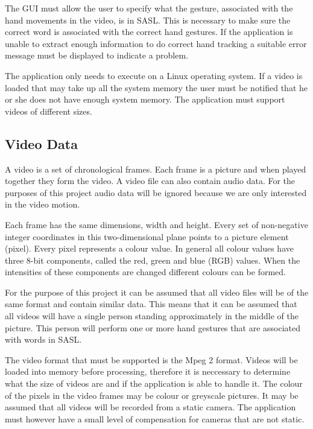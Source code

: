 \documentclass[a4paper,11pt,titlepage]{article}
\begin{document}
The GUI must allow the user to specify what the gesture, associated with the hand movements in the video, is in SASL. This is necessary to make sure the correct word is associated with the correct hand gestures. If the application is unable to extract enough information to do correct hand tracking a suitable error message must be displayed to indicate a problem.

The application only needs to execute on a Linux operating system. If a video is loaded that may take up all the system memory the user must be notified that he or she does not have enough system memory. The application must support videos of different sizes.

\subsection{Video Data}
A video is a set of chronological frames. Each frame is a picture and when played together they form the video. A video file can also contain audio data. For the purposes of this project audio data will be ignored because we are only interested in the video motion.

Each frame has the same dimensions, width and height. Every set of non-negative integer coordinates in this two-dimensional plane points to a picture element (pixel). Every pixel represents a colour value. In general all colour values have three 8-bit components, called the red, green and blue (RGB) values. When the intensities of these components are changed different colours can be formed.

For the purpose of this project it can be assumed that all video files will be of the same format and contain similar data. This means that it can be assumed that all videos will have a single person standing approximately in the middle of the picture. This person will perform one or more hand gestures that are associated with words in SASL.

The video format that must be supported is the Mpeg 2 format. Videos will be loaded into memory before processing, therefore it is neccessary to determine what the size of videos are and if the application is able to handle it. The colour of the pixels in the video frames may be colour or greyscale pictures. It may be assumed that all videos will be recorded from a static camera. The application must however have a small level of compensation for cameras that are not static.
\end{document}
